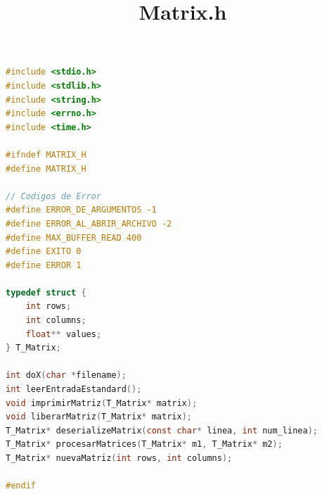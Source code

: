 \documentclass[a4paper,10pt]{article}
\begin{document}
\title{Matrix.h}
\begin{lstlisting}[language=C]
#include <stdio.h>
#include <stdlib.h>
#include <string.h>
#include <errno.h>
#include <time.h>

#ifndef MATRIX_H
#define MATRIX_H

// Codigos de Error
#define ERROR_DE_ARGUMENTOS -1
#define ERROR_AL_ABRIR_ARCHIVO -2
#define MAX_BUFFER_READ 400
#define EXITO 0
#define ERROR 1

typedef struct {
	int rows;
	int columns;
	float** values;
} T_Matrix;

int doX(char *filename);
int leerEntradaEstandard();
void imprimirMatriz(T_Matrix* matrix);
void liberarMatriz(T_Matrix* matrix);
T_Matrix* deserializeMatrix(const char* linea, int num_linea);
T_Matrix* procesarMatrices(T_Matrix* m1, T_Matrix* m2);
T_Matrix* nuevaMatriz(int rows, int columns);

#endif

\end{lstlisting}
\end{document}
